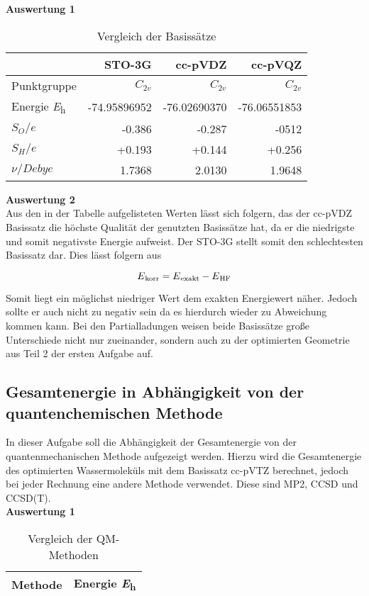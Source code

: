 \documentclass[12pt]{article}
\begin{document}
\begin{onehalfspace}
\noindent
\textbf{Auswertung 1}\\
\begin{table}[!htpb]
\centering
\caption{Vergleich der Basissätze}
\begin{tabular}{lrrr}
\toprule
 &
STO-3G &
cc-pVDZ & cc-pVQZ \\
\midrule
Punktgruppe & $C _{2v}$ & $C _{2v}$ & $C _{2v}$ \\
Energie \si{\hartree}    & -74.95896952 & -76.02690370 & -76.06551853 \\
$S _O / \textit{e}$ & -0.386 & -0.287  & -0512\\
$S _H / \textit{e}$ & +0.193 & +0.144  & +0.256\\
$\nu / \textit{Debye}$ & 1.7368 & 2.0130  & 1.9648\\
\bottomrule
\end{tabular}
\end{table} 
\textbf{Auswertung 2}\\
Aus den in der Tabelle aufgelisteten Werten lässt sich folgern, das der cc-pVDZ Basissatz
die höchste Qualität der genutzten Basissätze hat, da er die niedrigste und somit negativste Energie aufweist. 
Der STO-3G stellt somit den schlechtesten Basissatz dar. Dies lässt folgern aus 

\begin{equation}
    E\textsubscript{korr} = E\textsubscript{exakt} - E\textsubscript{HF}
\end{equation}

Somit liegt ein möglichst niedriger Wert dem exakten Energiewert näher. Jedoch sollte er auch nicht zu negativ sein da es hierdurch wieder zu Abweichung kommen kann.
 Bei den Partialladungen weisen beide Basissätze große Unterschiede
 nicht nur zueinander, sondern auch zu der optimierten Geometrie aus Teil 2 der ersten Aufgabe auf.
\subsection{Gesamtenergie in Abhängigkeit von der quantenchemischen Methode}
In dieser Aufgabe soll die Abhängigkeit der Gesamtenergie von der quantenmechanischen Methode aufgezeigt werden.
Hierzu wird die Gesamtenergie des optimierten Wassermoleküls mit dem Basissatz cc-pVTZ berechnet, jedoch bei jeder Rechnung eine andere Methode verwendet. Diese sind MP2, CCSD und CCSD(T).\\
\textbf{Auswertung 1}\\

\begin{table}[!htpb]
\centering
\caption{ Vergleich der QM-Methoden}
\begin{tabular}{ll}
\toprule
Methode &   Energie \si{\hartree} \\
\midrule


\end{tabular}
\end{table}
\end{onehalfspace}
\end{document}
